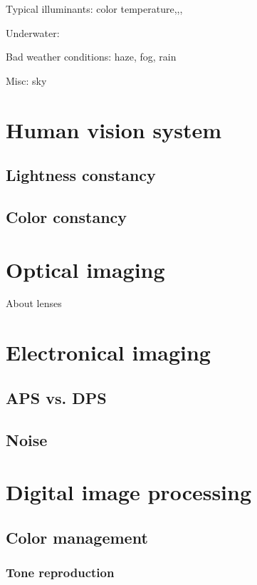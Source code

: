 \documentclass[a4paper]{article}
\begin{document}
Typical illuminants: color temperature,,,

Underwater: 

Bad weather conditions: haze, fog, rain

Misc: sky

\section{Human vision system}

\subsection{Lightness constancy}

\subsection{Color constancy}

\section{Optical imaging}

About lenses

\section{Electronical imaging}

\subsection{APS vs. DPS}

\subsection{Noise}

\section{Digital image processing}

\subsection{Color management}

\subsubsection{Tone reproduction}
\end{document}
